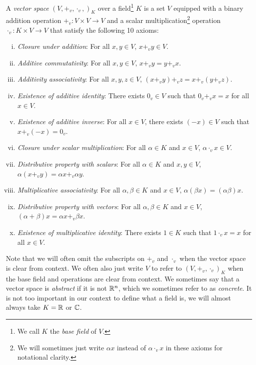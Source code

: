 \begin{tcolorbox}
  \begin{definition}
    A \emph{vector space}
    $(V, +_v, \cdot_v,)_K$ over a field\footnote{We call $K$ the \emph{base field} of $V$.} $K$ is a set
    $V$ equipped with a binary addition operation
    $+_v : V \times V \to V$ and a scalar multiplication\footnote{We will sometimes just write $\alpha x$ instead of $\alpha \cdot_v x$ in these axioms for notational clarity.}
    operation $\cdot_v : K \times V \to V$
    that satisfy the following 10 axioms:
    \begin{enumerate}[(i)]
      \item \emph{Closure under addition}:
        For all $x, y \in V$, $x +_v y \in V$.
      \item \emph{Additive commutativity}:
        For all $x, y \in V$, $x +_v y = y +_v x$.
      \item \emph{Additivity associativity}:
        For all $x, y, z \in V$,
        $(x +_v y) +_v z = x +_v (y +_v z)$.
      \item \emph{Existence of additive identity}:
        There exists $0_v \in V$ such that
        $0_v +_v x = x$ for all $x \in V$.
      \item \emph{Existence of additive inverse}:
        For all $x \in V$, there exists $(-x) \in V$
        such that $x +_v (-x) = 0_v$.
      \item \emph{Closure under scalar multiplication}:
        For all $\alpha \in K$ and $x \in V$,
        $\alpha \cdot_v x \in V$.
      \item \emph{Distributive property with scalars}:
        For all $\alpha \in K$ and $x, y \in V$,
        $\alpha (x +_v y) = \alpha x +_v \alpha y$.
      \item \emph{Multiplicative associativity}:
        For all $\alpha, \beta \in K$ and $x \in V$,
        $\alpha(\beta x) = (\alpha \beta) x$.
      \item \emph{Distributive property with vectors}:
        For all $\alpha, \beta \in K$ and $x \in V$,
        $(\alpha + \beta) x = \alpha x +_v \beta x$.
      \item \emph{Existence of multiplicative identity}:
        There exists $1 \in K$ such that
        $1 \cdot_v x = x$ for all $x \in V$.
    \end{enumerate}
  \end{definition}
\end{tcolorbox}

Note that we will often omit the subscripts on $+_v$
and $\cdot_v$ when the vector space is clear from context.
We often also just write $V$ to refer to
$(V, +_v, \cdot_v)_K$ when the base field and
operations are clear from context.
We sometimes say that a vector space is \emph{abstract}
if it is not $\mathbb{R}^n$, which we sometimes refer to as
\emph{concrete}. It is not too important in our context
to define what a field is, we will almost always
take $K = \mathbb{R}$ or $\mathbb{C}$.

